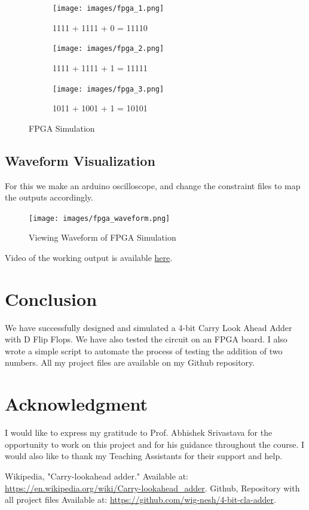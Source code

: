 \documentclass[conference]{IEEEtran}
\begin{document}
\begin{figure}[H]
    \centering
    \begin{subfigure}{0.4\textwidth}
        \texttt{[image: images/fpga\_1.png]}
        \caption{1111 + 1111 + 0 = 11110}
    \end{subfigure}
    \hfill
    \begin{subfigure}{0.4\textwidth}
        \texttt{[image: images/fpga\_2.png]}
        \caption{1111 + 1111 + 1 = 11111}
    \end{subfigure}
    \hfill
    \begin{subfigure}{0.4\textwidth}
        \texttt{[image: images/fpga\_3.png]}
        \caption{1011 + 1001 + 1 = 10101}
    \end{subfigure}
    
    \caption{FPGA Simulation}
\end{figure}

\subsection{Waveform Visualization}

For this we make an arduino oscilloscope, and change the constraint files to map the outputs accordingly.

\begin{figure}[H]
    \centering
    \texttt{[image: images/fpga\_waveform.png]}
    \caption{Viewing Waveform of FPGA Simulation}
\end{figure}

Video of the working output is available \href{https://iiitaphyd-my.sharepoint.com/:f:/g/personal/vigneshvembar_m_students_iiit_ac_in/Ek1zK19mmwBGhRlQdIGQBK4By9x6MJ-vOQfoJsAwDm6LJg?e=6zw7ME}{here}.

\section{Conclusion}
We have successfully designed and simulated a 4-bit Carry Look Ahead Adder with D Flip Flops. We have also tested the circuit on an FPGA board. 
I also wrote a simple script to automate the process of testing the addition of two numbers. All my project files are available on my Github repository. \cite{b2}

\section*{Acknowledgment}
I would like to express my gratitude to Prof. Abhishek Srivastava for the opportunity to work on this project and for his guidance throughout the course. I would also like to thank my Teaching Assistants for their support and help.

\begin{thebibliography}{00}
     Wikipedia, "Carry-lookahead adder." Available at: \url{https://en.wikipedia.org/wiki/Carry-lookahead_adder}.
     Github, Repository with all project files Available at: \url{https://github.com/wig-nesh/4-bit-cla-adder}.
\end{thebibliography}
    
\end{document}
